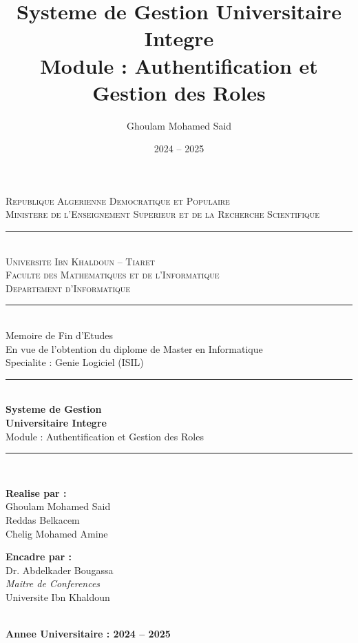 \documentclass[12pt,a4paper]{report}
\title{Systeme de Gestion Universitaire Integre \\
       Module : Authentification et Gestion des Roles}
\author{Ghoulam Mohamed Said}
\date{2024 -- 2025}
\begin{document}

\begin{titlepage}
\begin{center}

\textsc{\large Republique Algerienne Democratique et Populaire}\\[0.2cm]
\textsc{Ministere de l'Enseignement Superieur et de la Recherche Scientifique}\\[0.5cm]

\rule{\linewidth}{0.5mm}\\[0.3cm]
\textsc{\Large Universite Ibn Khaldoun -- Tiaret}\\[0.2cm]
\textsc{Faculte des Mathematiques et de l'Informatique}\\[0.2cm]
\textsc{Departement d'Informatique}\\
\rule{\linewidth}{0.5mm}\\[1.5cm]

{\large Memoire de Fin d'Etudes}\\[0.3cm]
{\large En vue de l'obtention du diplome de Master en Informatique}\\[0.2cm]
{\large Specialite : Genie Logiciel (ISIL)}\\[2cm]

\textcolor{myblue}{\rule{0.6\linewidth}{1pt}}\\[0.5cm]
{\Huge \bfseries Systeme de Gestion}\\[0.3cm]
{\Huge \bfseries Universitaire Integre}\\[0.5cm]
{\Large \textcolor{mygold}{Module : Authentification et Gestion des Roles}}\\[0.5cm]
\textcolor{myblue}{\rule{0.6\linewidth}{1pt}}\\[2cm]

\begin{minipage}{0.45\textwidth}
\begin{flushleft}
\textbf{Realise par :}\\[0.2cm]
Ghoulam Mohamed Said\\
Reddas Belkacem\\
Chelig Mohamed Amine
\end{flushleft}
\end{minipage}
\hfill
\begin{minipage}{0.45\textwidth}
\begin{flushright}
\textbf{Encadre par :}\\[0.2cm]
Dr. Abdelkader Bougassa\\
\textit{Maitre de Conferences}\\
Universite Ibn Khaldoun
\end{flushright}
\end{minipage}\\[2cm]

{\large \textbf{Annee Universitaire : 2024 -- 2025}}

\end{center}
\end{titlepage}
\end{document}
